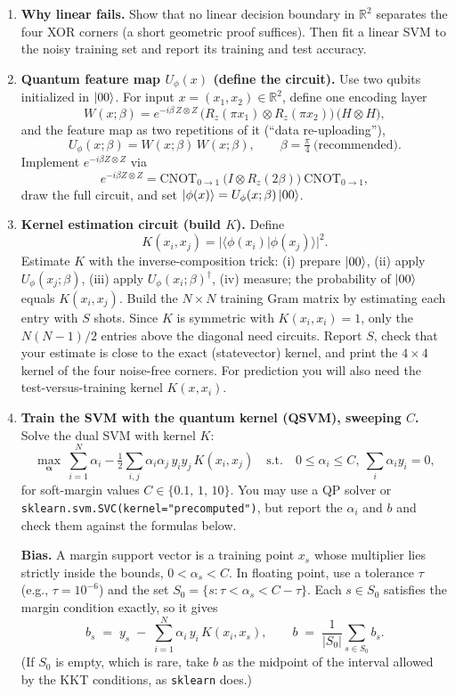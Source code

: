 \documentclass[11pt]{article}
\begin{document}
\begin{enumerate}[label=(\alph*)]
\item \textbf{Why linear fails.} Show that no linear decision boundary in $\mathbb{R}^2$ separates the four XOR corners (a short geometric proof suffices). Then fit a linear SVM to the noisy training set and report its training and test accuracy.

\item \textbf{Quantum feature map $U_\phi(x)$ (define the circuit).} Use two qubits initialized in $\ket{00}$. For input $x=(x_1,x_2)\in\mathbb{R}^2$, define one encoding layer
\[
W(x;\beta) = e^{-i\beta\,Z\otimes Z}\,\big(R_z(\pi x_1)\otimes R_z(\pi x_2)\big)\,\big(H\otimes H\big),
\]
and the feature map as two repetitions of it (``data re-uploading''),
\[
U_\phi(x;\beta) = W(x;\beta)\,W(x;\beta), \qquad \beta=\tfrac{\pi}{4}\ \text{(recommended)}.
\]
Implement $e^{-i\beta Z\otimes Z}$ via
\[
e^{-i\beta Z\otimes Z} =\mathrm{CNOT}_{0\to1}\ \big(I\otimes R_z(2\beta)\big)\ \mathrm{CNOT}_{0\to1},
\]
draw the full circuit, and set $\ket{\phi(x)}=U_\phi(x;\beta)\ket{00}$.

\item \textbf{Kernel estimation circuit (build $K$).} Define
\[
K(x_i,x_j)=|\langle \phi(x_i)|\phi(x_j)\rangle|^2.
\]
Estimate $K$ with the inverse-composition trick: (i) prepare $\ket{00}$, (ii) apply $U_\phi(x_j;\beta)$, (iii) apply $U_\phi(x_i;\beta)^\dagger$, (iv) measure; the probability of $\ket{00}$ equals $K(x_i,x_j)$. Build the $N\times N$ training Gram matrix by estimating each entry with $S$ shots. Since $K$ is symmetric with $K(x_i,x_i)=1$, only the $N(N-1)/2$ entries above the diagonal need circuits. Report $S$, check that your estimate is close to the exact (statevector) kernel, and print the $4\times4$ kernel of the four noise-free corners. For prediction you will also need the test-versus-training kernel $K(x,x_i)$.

\item \textbf{Train the SVM with the quantum kernel (QSVM), sweeping $C$.}
Solve the dual SVM with kernel $K$:
\[
\max_{\boldsymbol{\alpha}}\ \sum_{i=1}^N \alpha_i - \tfrac{1}{2}\sum_{i,j} \alpha_i\alpha_j\,y_i y_j\,K(x_i,x_j)
\quad \text{s.t.}\quad
0\le \alpha_i \le C,\ \sum_i \alpha_i y_i = 0,
\]
for soft-margin values $C\in\{0.1,\,1,\,10\}$. You may use a QP solver or \texttt{sklearn.svm.SVC(kernel="precomputed")}, but report the $\alpha_i$ and $b$ and check them against the formulas below.

\medskip
\noindent\textbf{Bias.} A margin support vector is a training point $x_s$ whose multiplier lies strictly inside the bounds, $0<\alpha_s<C$. In floating point, use a tolerance $\tau$ (e.g., $\tau=10^{-6}$) and the set $S_0 = \{ s : \tau < \alpha_s < C-\tau \}$. Each $s\in S_0$ satisfies the margin condition exactly, so it gives
\[
b_s \;=\; y_s \;-\; \sum_{i=1}^{N} \alpha_i\,y_i\,K(x_i, x_s),
\qquad
b \;=\; \frac{1}{|S_0|}\sum_{s\in S_0} b_s .
\]
(If $S_0$ is empty, which is rare, take $b$ as the midpoint of the interval allowed by the KKT conditions, as \texttt{sklearn} does.)


\end{enumerate}
\end{document}
